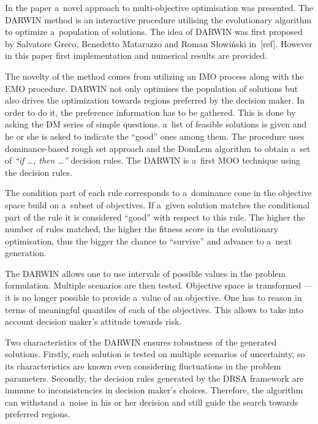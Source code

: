 In the paper a~novel approach to multi-objective optimisation was
presented. The DARWIN method is an interactive procedure utilising the
evolutionary algorithm to optimize a~population of solutions. The idea of
DARWIN was first proposed by Salvatore Greco, Benedetto Matarazzo and Roman
Słowiński in~[ref]. However in this paper first implementation and numerical
results are provided.

The novelty of the method comes from utilizing an IMO process along with the
EMO procedure. DARWIN not only optimises the population of solutions but also
drives the optimization towards regions preferred by the decision maker. In
order to do it, the preference information has to be gathered. This is done by
asking the DM series of simple questions. a~list of feasible solutions is
given and he or she is asked to indicate the ``good'' ones among them. The
procedure uses dominance-based rough set approach and the DomLem algorithm to
obtain a~set of \textit{``if \dots, then \dots''} decision rules. The DARWIN
is a~first MOO technique using the decision rules.

The condition part of each rule corresponds to a~dominance cone in the
objective space build on a~subset of objectives. If a~given solution matches
the conditional part of the rule it is considered ``good'' with respect to
this rule. The higher the number of rules matched, the higher the fitness
score in the evolutionary optimisation, thus the bigger the chance to
``survive'' and advance to a~next generation.

The DARWIN allows one to use intervals of possible values in the problem
formulation. Multiple scenarios are then tested. Objective space is
transformed --- it is no longer possible to provide a~value of an
objective. One has to reason in terms of meaningful quantiles of each of the
objectives. This allows to take into account decision maker's attitude towards
risk.

Two characteristics of the DARWIN ensures robustness of the generated
solutions. Firstly, each solution is tested on multiple scenarios of
uncertainty, so its characteristics are known even considering fluctuations in
the problem parameters. Secondly, the decision rules generated by the DRSA
framework are immune to inconsistencies in decision maker's
choices. Therefore, the algorithm can withstand a~noise in his or her decision
and still guide the search towards preferred regions.

